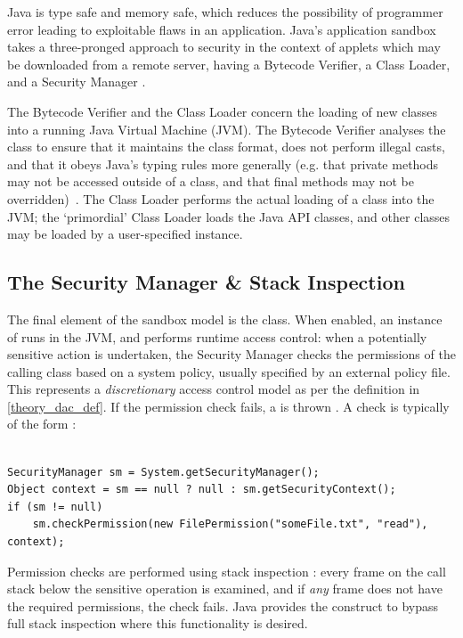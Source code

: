 Java is type safe and memory safe, which reduces the possibility of programmer error leading to exploitable flaws in an application. Java's application sandbox takes a three-pronged approach to security in the context of applets which may be downloaded from a remote server, having a Bytecode Verifier, a Class Loader, and a Security Manager \cite{mcgraw1999securingjava}.

The Bytecode Verifier and the Class Loader concern the loading of new classes into a running Java Virtual Machine (JVM). The Bytecode Verifier analyses the class to ensure that it maintains the class format, does not perform illegal casts, and that it obeys Java's typing rules more generally (e.g. that private methods may not be accessed outside of a class,  and that final methods may not be overridden)~\cite{lindholm2014java}. The Class Loader performs the actual loading of a class into the JVM; the `primordial' Class Loader \cite{mcgraw1999securingjava} loads the Java API classes, and other classes may be loaded by a user-specified  instance.

\subsection{The Security Manager \& Stack Inspection}

The final element of the sandbox model is the  class. When enabled, an instance of  runs in the JVM, and performs runtime access control: when a potentially sensitive action is undertaken, the Security Manager checks the permissions of the calling class based on a system policy, usually specified by an external policy file. This represents a \textit{discretionary} access control model as per the definition in \ref{theory_dac_def}. If the permission check fails, a  is thrown \cite{gosling2014java}. A check is typically of the form \cite{javasecmanagerdoc}:

\begin{verbatim}

SecurityManager sm = System.getSecurityManager();
Object context = sm == null ? null : sm.getSecurityContext();
if (sm != null)
	sm.checkPermission(new FilePermission("someFile.txt", "read"), context);
\end{verbatim}

Permission checks are performed using stack inspection \cite{gong2003javasecurity}: every frame on the call stack below the sensitive operation is examined, and if \textit{any} frame does not have the required permissions, the check fails. Java provides the  construct to bypass full stack inspection \cite{gong2003javasecurity} where this functionality is desired.

